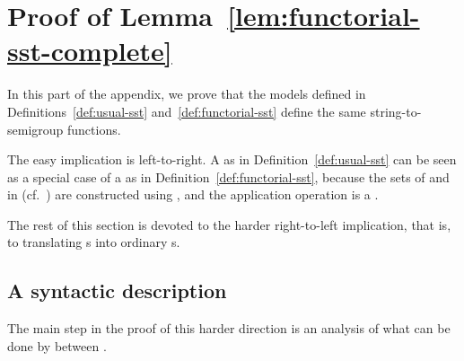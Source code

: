\section{Proof of Lemma~\ref{lem:functorial-sst-complete}}
In this part of the appendix, we prove that the models defined in Definitions~\ref{def:usual-sst} and~\ref{def:functorial-sst} define the same string-to-semigroup functions.

The easy implication is left-to-right. 
    A  as in Definition~\ref{def:usual-sst} can be seen as a special case of a \functorialsst as in Definition~\ref{def:functorial-sst}, because the sets of  and  in  (cf.~) are constructed using , and the application operation is a . 

The rest of this section is devoted to the harder right-to-left implication, that is, to translating \functorialsst{}s into ordinary \sst{}s.

\subsection{A syntactic description}

The main step in the proof of this harder direction is an analysis of what can be done by  between .

